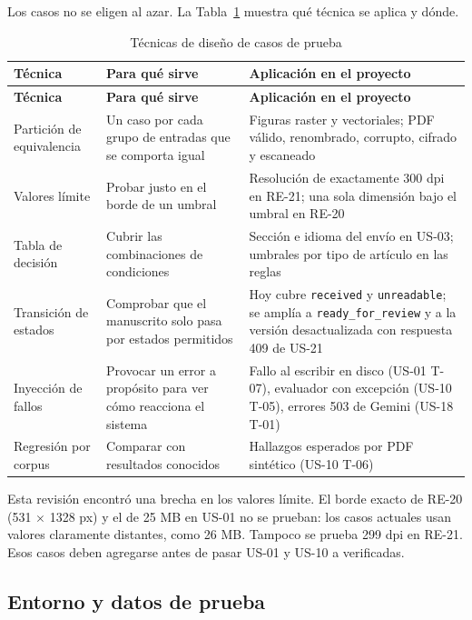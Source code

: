 Los casos no se eligen al azar. La Tabla~\ref{tab:3-9} muestra qué técnica se aplica y dónde.

{\small
\begin{longtable}{@{}>{\raggedright\arraybackslash}p{}>{\raggedright\arraybackslash}p{}>{\raggedright\arraybackslash}p{}@{}}
\caption{Técnicas de diseño de casos de prueba}\label{tab:3-9}\\
\toprule
\textbf{Técnica} & \textbf{Para qué sirve} & \textbf{Aplicación en el proyecto} \\
\midrule
\endfirsthead
\toprule
\textbf{Técnica} & \textbf{Para qué sirve} & \textbf{Aplicación en el proyecto} \\
\midrule
\endhead
\bottomrule
\endfoot
\endlastfoot
Partición de equivalencia & Un caso por cada grupo de entradas que se comporta igual & Figuras raster y vectoriales; PDF válido, renombrado, corrupto, cifrado y escaneado \\
Valores límite & Probar justo en el borde de un umbral & Resolución de exactamente 300 dpi en RE-21; una sola dimensión bajo el umbral en RE-20 \\
Tabla de decisión & Cubrir las combinaciones de condiciones & Sección e idioma del envío en US-03; umbrales por tipo de artículo en las reglas \\
Transición de estados & Comprobar que el manuscrito solo pasa por estados permitidos & Hoy cubre \texttt{received} y \texttt{unreadable}; se amplía a \texttt{ready\_\allowbreak{}for\_\allowbreak{}review} y a la versión desactualizada con respuesta 409 de US-21 \\
Inyección de fallos & Provocar un error a propósito para ver cómo reacciona el sistema & Fallo al escribir en disco (US-01 T-07), evaluador con excepción (US-10 T-05), errores 503 de Gemini (US-18 T-01) \\
Regresión por corpus & Comparar con resultados conocidos & Hallazgos esperados por PDF sintético (US-10 T-06) \\
\end{longtable}
}

Esta revisión encontró una brecha en los valores límite. El borde exacto de RE-20 (531 $\times$ 1328 px) y el de 25 MB en US-01 no se prueban: los casos actuales usan valores claramente distantes, como 26 MB. Tampoco se prueba 299 dpi en RE-21. Esos casos deben agregarse antes de pasar US-01 y US-10 a verificadas.

\subsection{Entorno y datos de prueba}


